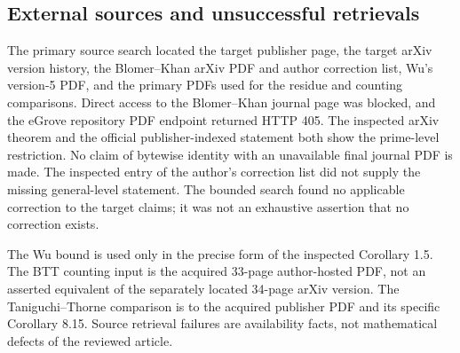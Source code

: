 \documentclass[10pt]{article}
\begin{document}
\subsection*{External sources and unsuccessful retrievals}
The primary source search located the target publisher page, the target arXiv version history, the Blomer–Khan arXiv PDF and author correction list, Wu’s version-5 PDF, and the primary PDFs used for the residue and counting comparisons. Direct access to the Blomer–Khan journal page was blocked, and the eGrove repository PDF endpoint returned HTTP 405. The inspected arXiv theorem and the official publisher-indexed statement both show the prime-level restriction. No claim of bytewise identity with an unavailable final journal PDF is made. The inspected entry of the author’s correction list did not supply the missing general-level statement. The bounded search found no applicable correction to the target claims; it was not an exhaustive assertion that no correction exists.\par
The Wu bound is used only in the precise form of the inspected Corollary 1.5. The BTT counting input is the acquired 33-page author-hosted PDF, not an asserted equivalent of the separately located 34-page arXiv version. The Taniguchi–Thorne comparison is to the acquired publisher PDF and its specific Corollary 8.15. Source retrieval failures are availability facts, not mathematical defects of the reviewed article.\par
\end{document}
